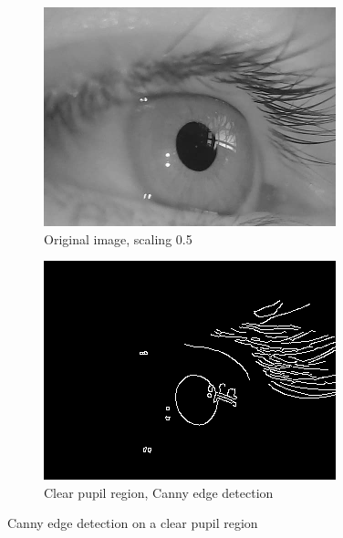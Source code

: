 \begin{figure}[ht]
    \centering
    \begin{subfigure}{.5\textwidth}
      \centering
      \includegraphics[width=.9\linewidth]{plots/orig_canny.png}
      \caption{Original image, scaling 0.5}
      \label{fig:orig_canny}
    \end{subfigure}%
    \begin{subfigure}{.5\textwidth}
      \centering
      \includegraphics[width=.9\linewidth]{plots/canny.png}
      \caption{Clear pupil region, Canny edge detection}
      \label{fig:canny_region_clear}
    \end{subfigure}
    \caption{Canny edge detection on a clear pupil region}
    \label{fig:canny_clear}
\end{figure}

